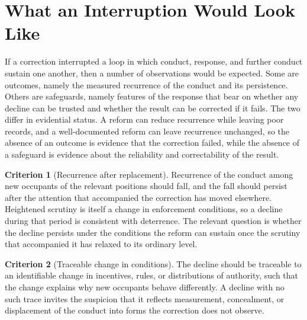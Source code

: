 \documentclass[11pt]{article}
\theoremstyle{definition}
\newtheorem{criterion}{Criterion}
\begin{document}
\section{What an Interruption Would Look Like}

If a correction interrupted a loop in which conduct, response, and further conduct sustain one another, then a number of observations would be expected. Some are outcomes, namely the measured recurrence of the conduct and its persistence. Others are safeguards, namely features of the response that bear on whether any decline can be trusted and whether the result can be corrected if it fails. The two differ in evidential status. A reform can reduce recurrence while leaving poor records, and a well-documented reform can leave recurrence unchanged, so the absence of an outcome is evidence that the correction failed, while the absence of a safeguard is evidence about the reliability and correctability of the result.

\begin{criterion}[Recurrence after replacement]
Recurrence of the conduct among new occupants of the relevant positions should fall, and the fall should persist after the attention that accompanied the correction has moved elsewhere. Heightened scrutiny is itself a change in enforcement conditions, so a decline during that period is consistent with deterrence. The relevant question is whether the decline persists under the conditions the reform can sustain once the scrutiny that accompanied it has relaxed to its ordinary level.
\end{criterion}

\begin{criterion}[Traceable change in conditions]
The decline should be traceable to an identifiable change in incentives, rules, or distributions of authority, such that the change explains why new occupants behave differently. A decline with no such trace invites the suspicion that it reflects measurement, concealment, or displacement of the conduct into forms the correction does not observe.
\end{criterion}
\end{document}
